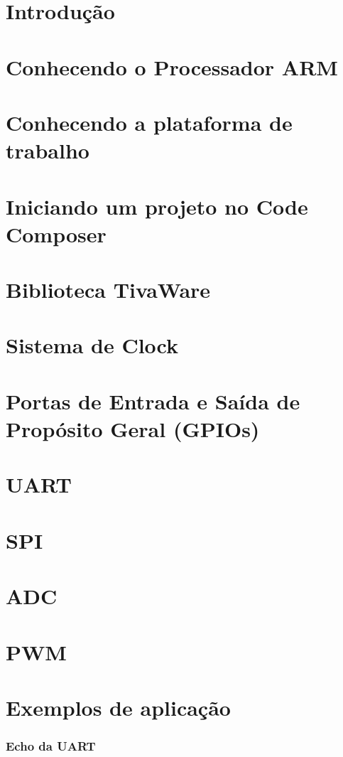 \documentclass[a4paper,10pt,oneside]{book}
\begin{document}
\maketitle

\chapter{Introdução}


\chapter{Conhecendo o Processador ARM}


\chapter{Conhecendo a plataforma de trabalho}


\chapter{Iniciando um projeto no Code Composer}


\chapter{Biblioteca TivaWare}


\chapter{Sistema de Clock}


\chapter{Portas de Entrada e Saída de Propósito Geral (GPIOs)}


\chapter{UART}


\chapter{SPI}


\chapter{ADC}


\chapter{PWM}


\chapter{Exemplos de aplicação}

\subsection{Echo da UART}





\end{document}
